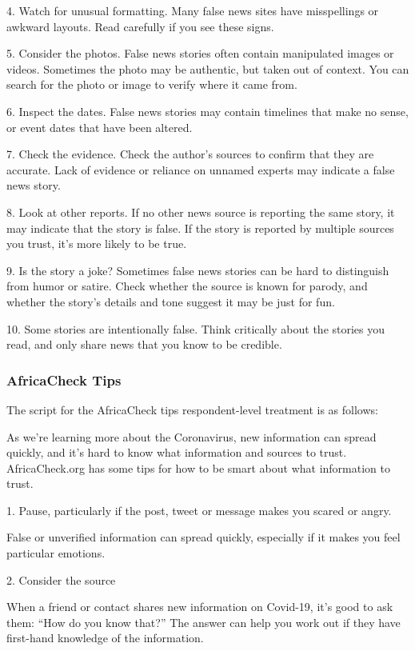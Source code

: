 \documentclass[letterpaper, 12pt, parskip=full,DIV=10]{scrartcl}
\begin{document}
4. Watch for unusual formatting. Many false news sites have misspellings or awkward layouts. Read carefully if you see these signs.

5. Consider the photos. False news stories often contain manipulated images or videos. Sometimes the photo may be authentic, but taken out of context. You can search for the photo or image to verify where it came from.

6. Inspect the dates. False news stories may contain timelines that make no sense, or event dates that have been altered.

7. Check the evidence. Check the author's sources to confirm that they are accurate. Lack of evidence or reliance on unnamed experts may indicate a false news story.

8. Look at other reports. If no other news source is reporting the same story, it may indicate that the story is false. If the story is reported by multiple sources you trust, it's more likely to be true.

9. Is the story a joke? Sometimes false news stories can be hard to distinguish from humor or satire. Check whether the source is known for parody, and whether the story's details and tone suggest it may be just for fun.

10. Some stories are intentionally false. Think critically about the stories you read, and only share news that you know to be credible.



\subsubsection{AfricaCheck Tips}\label{sec:actips}
The script for the AfricaCheck tips respondent-level treatment is as follows:

As we're learning more about the Coronavirus, new information can spread quickly, and it's hard to know what information and sources to trust. AfricaCheck.org has some tips for how to be smart about what information to trust. 

1. Pause, particularly if the post, tweet or message makes you scared or angry. 

False or unverified information can spread quickly, especially if it makes you feel particular emotions.

2. Consider the source

When a friend or contact shares new information on Covid-19, it’s good to ask them: “How do you know that?” The answer can help you work out if they have first-hand knowledge of the information.
\end{document}
